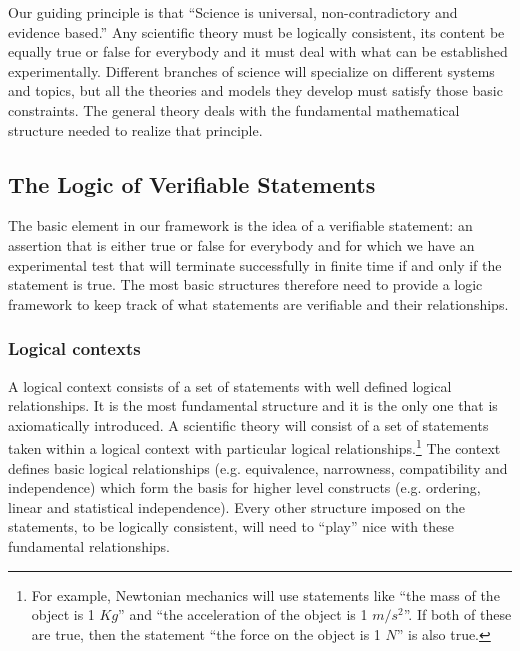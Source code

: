 \documentclass[twocolumn]{article}
\newif\ifextended
\newcommand\fact[2]{\ifextended \emph{#1}.#2 \fi}
\begin{document}
Our guiding principle is that ``Science is universal, non-contradictory and evidence based.'' Any scientific theory must be logically consistent, its content be equally true or false for everybody and it must deal with what can be established experimentally. Different branches of science will specialize on different systems and topics, but all the theories and models they develop must satisfy those basic constraints. The general theory deals with the fundamental mathematical structure needed to realize that principle. 

\fact{Not every subject can be studied by science} {The principle indirectly states that anything that is subjective, contradictory or not evidence based cannot be the subject of scientific investigation. The properties of prime numbers, moral and existential questions or the aesthetics of music fail in at least one of those respects and are excluded. Only the parts of nature that are accessible through consistent experimental verification can be studied scientifically. New experimental techniques have been extending that reach over time.}

\subsection{The Logic of Verifiable Statements}

The basic element in our framework is the idea of a verifiable statement: an assertion that is either true or false for everybody and for which we have an experimental test that will terminate successfully in finite time if and only if the statement is true. The most basic structures therefore need to provide a logic framework to keep track of what statements are verifiable and their relationships.

\subsubsection{Logical contexts}

A logical context consists of a set of statements with well defined logical relationships. It is the most fundamental structure and it is the only one that is axiomatically introduced.  A scientific theory will consist of a set of statements taken within a logical context with particular logical relationships.\footnote{For example, Newtonian mechanics will use statements like ``the mass of the object is 1 $Kg$'' and ``the acceleration of the object is 1 $m/s^2$''. If both of these are true, then the statement ``the force on the object is  1 $N$'' is also true.} The context defines basic logical relationships (e.g. equivalence, narrowness, compatibility and independence) which form the basis for higher level constructs (e.g. ordering, linear and statistical independence). Every other structure imposed on the statements, to be logically consistent, will need to ``play'' nice with these fundamental relationships.
\end{document}
